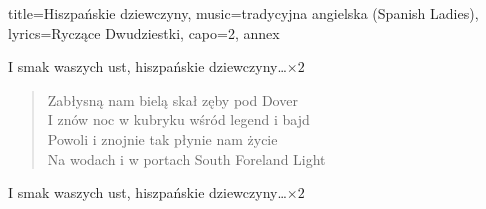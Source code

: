 \begin{song}{title={Hiszpańskie dziewczyny}, music={tradycyjna angielska (Spanish Ladies)}, lyrics={Ryczące Dwudziestki}, capo={2}, annex}
\begin{chorus}
        I smak waszych ust, hiszpańskie dziewczyny\ldots $\times 2$
    \end{chorus}
    \begin{verse}
        Zabłysną nam bielą skał zęby pod Dover \\
        I znów noc w kubryku wśród legend i bajd \\
        Powoli i znojnie tak płynie nam życie \\
        Na wodach i w portach South Foreland Light\footnotemark{}
    \end{verse}
    \begin{chorus}
        I smak waszych ust, hiszpańskie dziewczyny\ldots $\times 2$
    \end{chorus}
\end{song}

